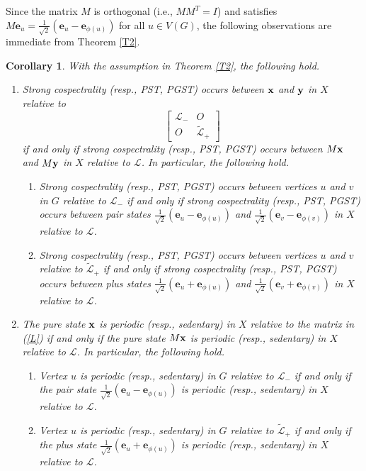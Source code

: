\documentclass[12pt,a4paper]{article}
\newtheorem{cor}{Corollary}
\def \e {{\mathbf e}}
\def \x {{\bf x}}
\def \y {{\bf y}}
\begin{document}
Since the matrix $M$ is orthogonal (i.e., $MM^T=I$) and satisfies $M\e_u=\frac{1}{\sqrt{2}}(\e_u-\e_{\phi(u)})$ for all $u\in V(G)$, the following observations are immediate from Theorem \ref{T2}.
\begin{cor}\label{C1}
With the assumption in Theorem \ref{T2}, the following hold.
\begin{enumerate}
\item Strong cospectrality (resp., PST, PGST) occurs between $\x$ and $\y$ in $X$ relative to 
\begin{equation}
\label{L}
\begin{bmatrix}
    \mathscr{L}_- & O\\ O & \widetilde{\mathscr{L}}_+
\end{bmatrix}
\end{equation}
 if and only if strong cospectrality (resp., PST, PGST) occurs between $M\x$ and $M\y$ in $X$ relative to $\mathscr{L}$. In particular, the following hold.
 \begin{enumerate}
\item Strong cospectrality (resp., PST, PGST) occurs between vertices $u$ and $v$ in $G$ relative to $\mathscr{L}_- $ if and only if strong cospectrality (resp., PST, PGST) occurs between pair states $\frac{1}{\sqrt{2}}(\e_u-\e_{\phi(u)})$ and $\frac{1}{\sqrt{2}}(\e_v-\e_{\phi(v)})$ in $X$ relative to $\mathscr{L}$.
\item Strong cospectrality (resp., PST, PGST) occurs between vertices $u$ and $v$ relative to $\widetilde{\mathscr{L}}_+$ if and only if strong cospectrality (resp., PST, PGST) occurs between plus states $\frac{1}{\sqrt{2}}(\e_u+\e_{\phi(u)})$ and $\frac{1}{\sqrt{2}}(\e_v+\e_{\phi(v)})$ in $X$ relative to $\mathscr{L}$.
 \end{enumerate}
\item The pure state $\x$ is periodic (resp., sedentary) in $X$ relative to the matrix in (\ref{L}) 
if and only if the pure state $M\x$ is periodic (resp., sedentary) in $X$ relative to $\mathscr{L}$. In particular, the following hold.
\begin{enumerate}
\item Vertex $u$ is periodic (resp., sedentary) in $G$ relative to $\mathscr{L}_- $ if and only if the pair state $\frac{1}{\sqrt{2}}(\e_u-\e_{\phi(u)})$ is periodic (resp., sedentary) in $X$ relative to $\mathscr{L}$.
\item Vertex $u$ is periodic (resp., sedentary) in $G$ relative to $\widetilde{\mathscr{L}}_+$ if and only if the plus state $\frac{1}{\sqrt{2}}(\e_u+\e_{\phi(u)})$ is periodic (resp., sedentary) in $X$ relative to $\mathscr{L}$.
\end{enumerate}
\end{enumerate}
\end{cor}
\end{document}
